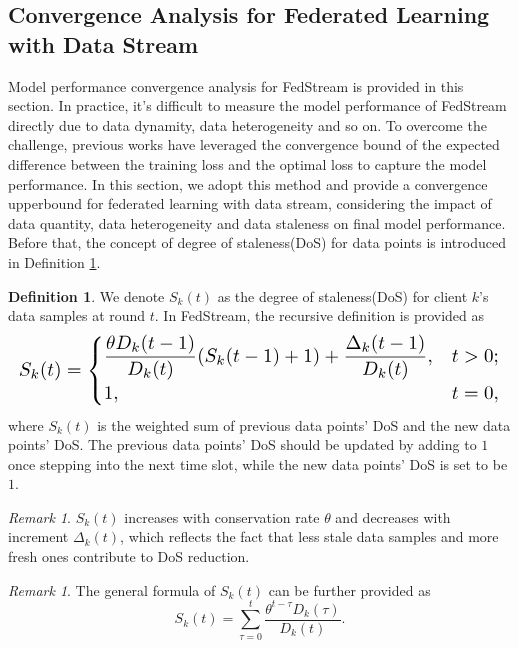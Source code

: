 \documentclass{article}
\theoremstyle{plain}
\theoremstyle{definition}
\newtheorem{definition}[theorem]{Definition}
\theoremstyle{remark}
\newtheorem{remark}[theorem]{Remark}
\begin{document}
\subsection{Convergence Analysis for Federated Learning with Data Stream}
Model performance convergence analysis for FedStream is provided in this section.
In practice, it's difficult to measure the model performance of FedStream directly due to data dynamity, data heterogeneity and so on.
To overcome the challenge, previous works have leveraged the convergence bound of the expected difference between the training loss and the optimal loss to capture the model performance.
In this section, we adopt this method and provide a convergence upperbound for federated learning with data stream, considering the impact of data quantity, data heterogeneity and data staleness on final model performance.
Before that, the concept of degree of staleness(DoS) for data points is introduced in Definition \ref{definition:1}.
\begin{definition}
  \label{definition:1}
  We denote $S_k(t)$ as the degree of staleness(DoS) for client $k$'s data samples at round $t$. In FedStream, the recursive definition is provided as 
  \begin{equation}
    \resizebox{\columnwidth}{!}{$
      S_k(t) = 
      \begin{cases}
        \dfrac{\theta D_k(t-1)}{D_k(t)}(S_k(t-1) + 1) + \dfrac{\Delta_k(t-1)}{D_k(t)}, & t > 0; \\
        1, & t = 0,
      \end{cases}
    $}
  \end{equation}
  where $S_k(t)$ is the weighted sum of previous data points' DoS and the new data points' DoS.
  The previous data points' DoS should be updated by adding to $1$ once stepping into the next time slot, while the new data points' DoS is set to be $1$.
\end{definition}

\begin{remark}
  $S_k(t)$ increases with conservation rate $\theta$ and decreases with increment $\Delta_k(t)$, which reflects the fact that less stale data samples and more fresh ones contribute to DoS reduction.
\end{remark}
\begin{remark}
  The general formula of $S_k(t)$ can be further provided as
  \begin{equation}
    S_k(t) = \sum_{\tau=0}^{t} \frac{\theta^{t-\tau} D_k(\tau)}{D_k(t)}.    
  \end{equation}
\end{remark}
\end{document}
